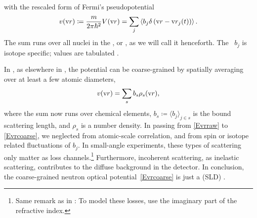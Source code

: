 with the rescaled form of Fermi's pseudopotential
%
%
%
%
\begin{equation}\label{Evrraw}
  v(\text{v}{r})
  \coloneqq \frac{m}{2\pi\hbar^2} V(\text{v}{r})
  = \sum_j\left\langle b_j \delta\left(\text{v}{r}-\text{v}{r}_j(t)\right)\right\rangle.
\end{equation}
The sum runs over all nuclei in the ,
%
%
or ,
%
as we will call it henceforth.
The ~$b_j$
%
%
%
is isotope specific;
%
values are tabulated \cite{Sea92}.

In ,
%
%
as elsewhere in  \cite{Sea89},
%
%
the potential can be coarse-grained by spatially averaging over at least a few atomic diameters,
\begin{equation}\label{Evrcoarse}
  v(\text{v}{r})
  = \sum_s b_s \rho_s(\text{v}{r}),
\end{equation}
%
where the sum now runs over chemical elements,
$b_s\coloneqq\langle b_j\rangle_{j\in s}$ is the bound  scattering length,
%
%
and $\rho_s$ is a number density.
%
%
%
In passing from \cref{Evrraw} to \cref{Evrcoarse},
we neglected 
%
%
from atomic-scale correlation,
%
%
and  from spin or isotope related fluctuations of $b_j$.
%
%
%
%
%
In small-angle experiments,
 these types of scattering only matter as loss channels.\footnote
{Same remark as in : To model these losses, use the
%
%
imaginary part of the refractive index.}
Furthermore, incoherent scattering, as inelastic scattering,
 contributes to the diffuse background in the detector.
%
%
%
%
%
In conclusion, the coarse-grained neutron optical potential~\cref{Evrcoarse}
%
%
%
is just a  (SLD)
%
%
\cite[eq.\ 2.8.37]{Sea89}.

